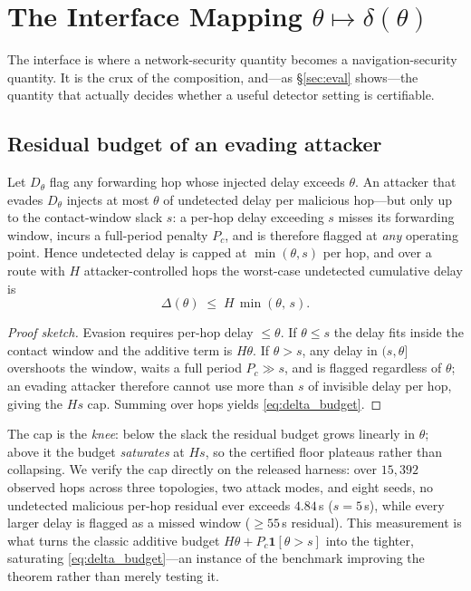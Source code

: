 \section{The Interface Mapping $\theta \mapsto \delta(\theta)$}
\label{sec:interface}
The interface is where a network-security quantity becomes a navigation-security
quantity. It is the crux of the composition, and---as \S\ref{sec:eval}
shows---the quantity that actually decides whether a useful detector setting is
certifiable.

\subsection{Residual budget of an evading attacker}
\begin{lemma}
\label{lem:residual}
Let $D_\theta$ flag any forwarding hop whose injected delay exceeds $\theta$. An
attacker that evades $D_\theta$ injects at most $\theta$ of undetected delay per
malicious hop---but only up to the contact-window slack $s$: a per-hop delay
exceeding $s$ misses its forwarding window, incurs a full-period penalty
$P_{\!c}$, and is therefore flagged at \emph{any} operating point. Hence
undetected delay is capped at $\min(\theta,s)$ per hop, and over a route with
$H$ attacker-controlled hops the worst-case undetected cumulative delay is
\begin{equation}
\label{eq:delta_budget}
\Delta(\theta) \;\le\; H\,\min(\theta,\,s).
\end{equation}
\end{lemma}
\begin{proof}[Proof sketch]
Evasion requires per-hop delay $\le\theta$. If $\theta\le s$ the delay fits
inside the contact window and the additive term is $H\theta$. If $\theta>s$, any
delay in $(s,\theta]$ overshoots the window, waits a full period
$P_{\!c}\gg s$, and is flagged regardless of $\theta$; an evading attacker
therefore cannot use more than $s$ of invisible delay per hop, giving the $Hs$
cap. Summing over hops yields \eqref{eq:delta_budget}.
\end{proof}

The cap is the \emph{knee}: below the slack the residual budget grows linearly
in $\theta$; above it the budget \emph{saturates} at $Hs$, so the certified
floor plateaus rather than collapsing. We verify the cap directly on the
released harness: over $15{,}392$ observed hops across three topologies, two
attack modes, and eight seeds, no undetected malicious per-hop residual ever
exceeds $4.84$\,s ($s=5$\,s), while every larger delay is flagged as a missed
window ($\ge55$\,s residual). This measurement is what turns the classic
additive budget $H\theta+P_{\!c}\mathbf{1}[\theta>s]$ into the tighter,
saturating \eqref{eq:delta_budget}---an instance of the benchmark improving the
theorem rather than merely testing it.

